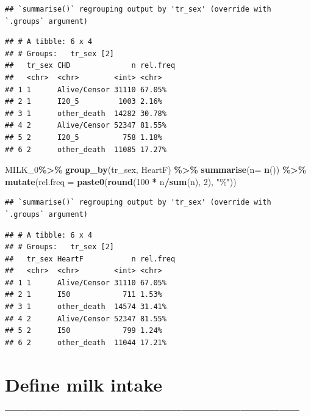 \documentclass[
]{article}
\newenvironment{Shaded}{\begin{snugshade}}{\end{snugshade}}
\newcommand{\DataTypeTok}[1]{\textcolor[rgb]{0.13,0.29,0.53}{#1}}
\newcommand{\DecValTok}[1]{\textcolor[rgb]{0.00,0.00,0.81}{#1}}
\newcommand{\KeywordTok}[1]{\textcolor[rgb]{0.13,0.29,0.53}{\textbf{#1}}}
\newcommand{\NormalTok}[1]{#1}
\newcommand{\OperatorTok}[1]{\textcolor[rgb]{0.81,0.36,0.00}{\textbf{#1}}}
\newcommand{\StringTok}[1]{\textcolor[rgb]{0.31,0.60,0.02}{#1}}
\begin{document}
\begin{verbatim}
## `summarise()` regrouping output by 'tr_sex' (override with `.groups` argument)
\end{verbatim}

\begin{verbatim}
## # A tibble: 6 x 4
## # Groups:   tr_sex [2]
##   tr_sex CHD              n rel.freq
##   <chr>  <chr>        <int> <chr>   
## 1 1      Alive/Censor 31110 67.05%  
## 2 1      I20_5         1003 2.16%   
## 3 1      other_death  14282 30.78%  
## 4 2      Alive/Censor 52347 81.55%  
## 5 2      I20_5          758 1.18%   
## 6 2      other_death  11085 17.27%
\end{verbatim}

\begin{Shaded}
\begin{Highlighting}[]
\NormalTok{MILK\_}\DecValTok{0}\OperatorTok{\%\textgreater{}\%}\StringTok{ }
\StringTok{  }\KeywordTok{group\_by}\NormalTok{(tr\_sex, HeartF) }\OperatorTok{\%\textgreater{}\%}
\StringTok{  }\KeywordTok{summarise}\NormalTok{(}\DataTypeTok{n=} \KeywordTok{n}\NormalTok{()) }\OperatorTok{\%\textgreater{}\%}
\StringTok{  }\KeywordTok{mutate}\NormalTok{(}\DataTypeTok{rel.freq =} \KeywordTok{paste0}\NormalTok{(}\KeywordTok{round}\NormalTok{(}\DecValTok{100} \OperatorTok{*}\StringTok{ }\NormalTok{n}\OperatorTok{/}\KeywordTok{sum}\NormalTok{(n), }\DecValTok{2}\NormalTok{), }\StringTok{"\%"}\NormalTok{))}
\end{Highlighting}
\end{Shaded}

\begin{verbatim}
## `summarise()` regrouping output by 'tr_sex' (override with `.groups` argument)
\end{verbatim}

\begin{verbatim}
## # A tibble: 6 x 4
## # Groups:   tr_sex [2]
##   tr_sex HeartF           n rel.freq
##   <chr>  <chr>        <int> <chr>   
## 1 1      Alive/Censor 31110 67.05%  
## 2 1      I50            711 1.53%   
## 3 1      other_death  14574 31.41%  
## 4 2      Alive/Censor 52347 81.55%  
## 5 2      I50            799 1.24%   
## 6 2      other_death  11044 17.21%
\end{verbatim}

\hypertarget{define-milk-intake}{%
\section{Define milk intake
---------------------------------------------}\label{define-milk-intake}}
\end{document}
